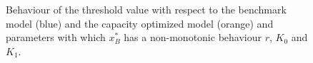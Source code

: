 

\begin{figure}[!htb]
	\begin{subfigmatrix}{3}
	\end{subfigmatrix}
	\caption{Behaviour of the threshold value with respect to the benchmark model (blue) and the capacity optimized model (orange) and parameters with which  $x^*_B$ has a non-monotonic behaviour $r$, $K_0$ and $K_1$.}
	\label{fig:2_x1}
\end{figure}


